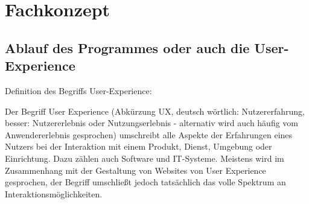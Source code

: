 \newpage

\section{Fachkonzept}
\subsection{Ablauf des Programmes oder auch die User-Experience}
Definition des Begriffs User-Experience:
\begin{munquote}
   Der Begriff User Experience (Abkürzung UX, deutsch wörtlich: Nutzererfahrung, besser: Nutzererlebnis oder Nutzungserlebnis - alternativ wird auch häufig vom Anwendererlebnis gesprochen) 
  umschreibt alle Aspekte der Erfahrungen eines Nutzers bei der Interaktion mit einem Produkt, Dienst, Umgebung oder Einrichtung. 
  Dazu zählen auch Software und IT-Systeme. Meistens wird im Zusammenhang mit der Gestaltung von Websites von User Experience gesprochen, der Begriff umschließt jedoch tatsächlich das volle Spektrum an Interaktionsmöglichkeiten.
\end{munquote}
